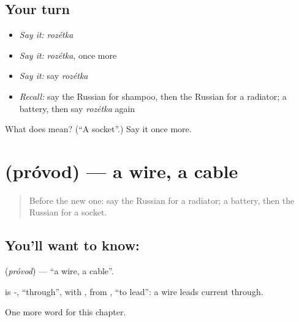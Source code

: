 \subsection*{Your turn}
\begin{itemize}
\raggedright
  \item \emph{Say it:} \emph{rozétka}
  \item \emph{Say it:} \emph{rozétka}, once more
  \item \emph{Say it:} say \emph{rozétka}
  \item \emph{Recall:} say the Russian for shampoo, then the Russian for a radiator; a battery, then say \emph{rozétka} again
\end{itemize}

\begin{tcolorbox}[breakable,colback=teal!4,colframe=teal!35!black,title={Before you move on}]
What does  mean? (\textquotedblleft{}A socket\textquotedblright{}.) Say it once more.
\end{tcolorbox}
\section[\texorpdfstring{\ru{провод} (próvod)}{провод (próvod)}]{ (próvod) — a wire, a cable}

\label{lesson:RU-C191-provod}



\begin{quote}
Before the new one: say the Russian for a radiator; a battery, then the Russian for a socket.
\end{quote}

\subsection*{You'll want to know: }
\textbf{} (\emph{próvod}) — \textquotedblleft{}a wire, a cable\textquotedblright{}.

\begin{cousinweb}
\textbf{} is \emph{-}, \textquotedblleft{}through\textquotedblright{}, with \emph{}, from \emph{}, \textquotedblleft{}to lead\textquotedblright{}: a wire leads current through.
\end{cousinweb}

\begin{grammarlens}[title={What you've built}]
One more word for this chapter.
\end{grammarlens}

